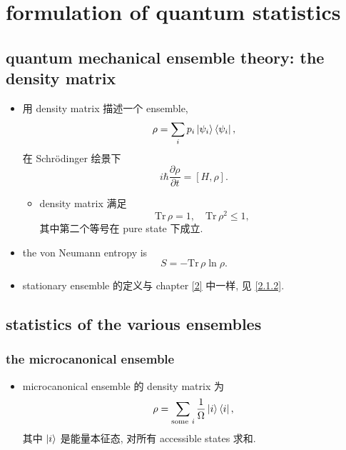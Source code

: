 \chapter{formulation of quantum statistics} \label{5}
\section{quantum mechanical ensemble theory: the density matrix}
\begin{itemize}
	\item 用 density matrix 描述一个 ensemble,
	\begin{equation}
		\rho = \sum_i p_i \ket{\psi_i} \bra{\psi_i},
	\end{equation}
	在 Schrödinger 绘景下
	\begin{equation}
		i \hbar \frac{\partial \rho}{\partial t} = [H, \rho].
	\end{equation}
	\begin{itemize}
		\item density matrix 满足
		\begin{equation}
			\mathrm{Tr} \, \rho = 1, \quad \mathrm{Tr} \, \rho^2 \leq 1,
		\end{equation}
		其中第二个等号在 pure state 下成立.
	\end{itemize}
	
	\item the von Neumann entropy is
	\begin{equation}
		S = - \mathrm{Tr} \, \rho \ln \rho.
	\end{equation}
	
	\item stationary ensemble 的定义与 chapter \ref{2} 中一样, 见 \eqref{2.1.2}.
\end{itemize}

\section{statistics of the various ensembles}
\subsection{the microcanonical ensemble}
\begin{itemize}
	\item microcanonical ensemble 的 density matrix 为
	\begin{equation}
		\rho = \sum_{\text{some} \ i} \frac{1}{\Omega} \ket{i} \bra{i},
	\end{equation}
	其中 $\ket{i}$ 是能量本征态, 对所有 accessible states 求和.
\end{itemize}

